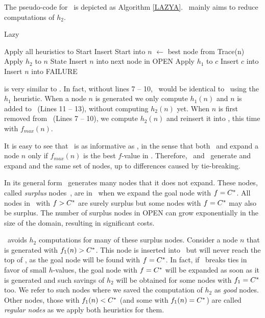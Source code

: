 The pseudo-code for  \lazyastar~is depicted as Algorithm \ref{LAZYA}.
\lazyastar~mainly aims to reduce computations of $h_2$.
\begin{algorithm}[h]
\caption{Lazy \astar}
\begin{algorithmic}[1]
    \State Apply all heuristics to Start
    \State Insert Start into \OPEN
        \State $n$ $\gets$ best node from \OPEN
            \Return Trace(n)
        \EndIf
            \State Apply $h_2$ to $n$
            State Insert $n$ into \OPEN
			 \Comment next node in OPEN
        \EndIf
            \State Apply $h_1$ to $c$
            \State Insert $c$ into \OPEN
        \EndFor
        \State Insert $n$ into \CLOSED
    \EndWhile
    \Return FAILURE
\EndProcedure
\end{algorithmic}
\label{LAZYA}
\end{algorithm}
\lazyastar is very similar to \astar.
In fact, without lines 7 -- 10, \lazyastar~would be identical to
\astar~using the $h_1$ heuristic.
When a node $n$ is generated we only compute $h_1(n)$ and $n$ is added to
\OPEN ~(Lines 11 -- 13), without computing $h_2(n)$ yet.
When $n$ is first removed from \OPEN~(Lines 7 -- 10), we compute $h_2(n)$ and
reinsert it into \OPEN, this time with $f_{max}(n)$.

It is easy to see that \lazyastar~is as informative as \astarmax, in
the sense that both \astarmax~and \lazyastar expand a node $n$ only
if $f_{max}(n)$ is the best $f$-value in \OPEN.  Therefore,
\lazyastar~and \astarmax~generate and expand and the same set of
nodes, up to differences caused by tie-breaking.

In its general form \astar~generates many nodes that it does not expand. These
nodes, called {\em surplus} nodes~\cite{Felner2012}, are in \OPEN~when we
expand the goal node with $f=C^\ast$. All nodes in \OPEN~with $f>C^\ast$ are
surely surplus but some nodes with $f=C^\ast$ may also be surplus. The number
of surplus nodes in OPEN can grow exponentially in the size of the domain, resulting in
significant costs.

\lazyastar~avoids $h_2$ computations for many of these surplus nodes. Consider
a node $n$ that is generated with $f_1(n) > C^\ast$. This node is inserted
into \OPEN~but will never reach the top of \OPEN, as the goal node will be found
with $f=C^\ast$. In fact, if \OPEN~breaks ties in favor of small $h$-values,
the goal node with $f=C^\ast$ will be expanded as soon as it is generated and such
savings of $h_2$ will be obtained for some nodes with $f_1=C^\ast$ too. We
refer to such nodes where we saved the computation of $h_2$ as {\em good} nodes. Other nodes,
those with $f_1(n) < C^\ast$ (and some with $f_1(n) = C^\ast$) are called
{\em regular nodes} as we apply both heuristics for them.

